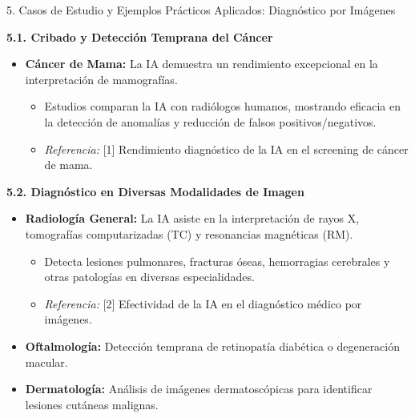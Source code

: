 \documentclass[aspectratio=169]{beamer}
\begin{document}
\begin{frame}[fragile]{5. Casos de Estudio y Ejemplos Prácticos Aplicados: Diagnóstico por Imágenes}


\textbf{5.1. Cribado y Detección Temprana del Cáncer}
\begin{itemize}
  \item \textbf{Cáncer de Mama:} La IA demuestra un rendimiento excepcional en la interpretación de mamografías.
  \begin{itemize}
    \item Estudios comparan la IA con radiólogos humanos, mostrando eficacia en la detección de anomalías y reducción de falsos positivos/negativos.
    \item \textit{Referencia:} [1] Rendimiento diagnóstico de la IA en el screening de cáncer de mama.
  \end{itemize}
\end{itemize}
\textbf{5.2. Diagnóstico en Diversas Modalidades de Imagen}
\begin{itemize}
  \item \textbf{Radiología General:} La IA asiste en la interpretación de rayos X, tomografías computarizadas (TC) y resonancias magnéticas (RM).
  \begin{itemize}
    \item Detecta lesiones pulmonares, fracturas óseas, hemorragias cerebrales y otras patologías en diversas especialidades.
    \item \textit{Referencia:} [2] Efectividad de la IA en el diagnóstico médico por imágenes.
  \end{itemize}
  \item \textbf{Oftalmología:} Detección temprana de retinopatía diabética o degeneración macular.
  \item \textbf{Dermatología:} Análisis de imágenes dermatoscópicas para identificar lesiones cutáneas malignas.
\end{itemize}
\end{frame}
\end{document}
